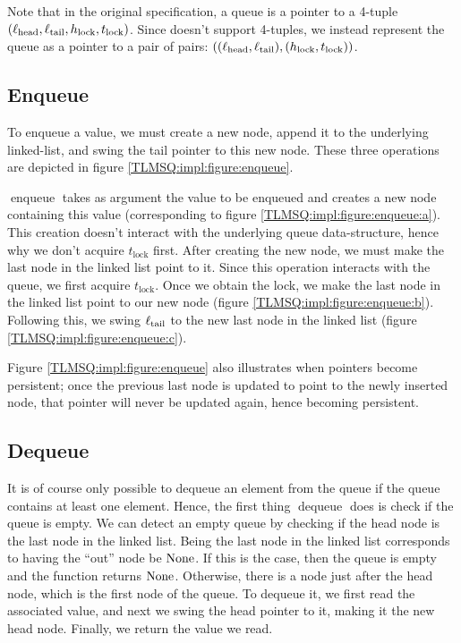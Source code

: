 \documentclass[a4paper, 10pt]{report}
\theoremstyle{definition}
\newcommand{\enqueue}{\operatorname{enqueue}}
\newcommand{\dequeue}{\operatorname{dequeue}}
\newcommand{\locN}[1]{\loc_{\mathrm{#1}}}
\newcommand{\lochead}{\locN{head}}
\newcommand{\loctail}{\locN{tail}}
\newcommand{\Hlock}{h_{\mathrm{lock}}}
\newcommand{\Tlock}{t_{\mathrm{lock}}}
\begin{document}
Note that in the original specification, a queue is a pointer to a 4-tuple $(\lochead, \loctail, \Hlock, \Tlock)$. Since \heaplang doesn't support 4-tuples, we instead represent the queue as a pointer to a pair of pairs: $((\lochead, \loctail), (\Hlock, \Tlock))$.

\subsection{Enqueue}

To enqueue a value, we must create a new node, append it to the underlying linked-list, and swing the tail pointer to this new node. These three operations are depicted in figure \ref{TLMSQ:impl:figure:enqueue}.

$\enqueue$ takes as argument the value to be enqueued and creates a new node containing this value (corresponding to figure \ref{TLMSQ:impl:figure:enqueue:a}). This creation doesn't interact with the underlying queue data-structure, hence why we don't acquire $\Tlock$ first. After creating the new node, we must make the last node in the linked list point to it. Since this operation interacts with the queue, we first acquire $\Tlock$. Once we obtain the lock, we make the last node in the linked list point to our new node (figure \ref{TLMSQ:impl:figure:enqueue:b}). Following this, we swing $\loctail$ to the new last node in the linked list (figure \ref{TLMSQ:impl:figure:enqueue:c}).

Figure \ref{TLMSQ:impl:figure:enqueue} also illustrates when pointers become persistent; once the previous last node is updated to point to the newly inserted node, that pointer will never be updated again, hence becoming persistent.

\subsection{Dequeue}

It is of course only possible to dequeue an element from the queue if the queue contains at least one element. Hence, the first thing $\dequeue$ does is check if the queue is empty. We can detect an empty queue by checking if the head node is the last node in the linked list. Being the last node in the linked list corresponds to having the ``out'' node be $\operatorname{None}$. If this is the case, then the queue is empty and the function returns $\operatorname{None}$. Otherwise, there is a node just after the head node, which is the first node of the queue. To dequeue it, we first read the associated value, and next we swing the head pointer to it, making it the new head node. Finally, we return the value we read.
\end{document}
